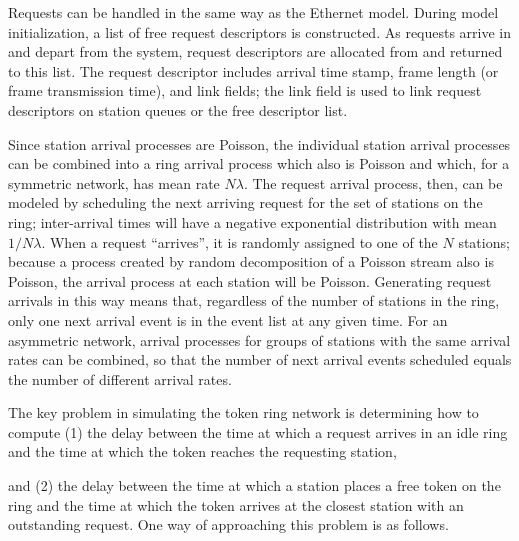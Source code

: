 Requests can be handled in the same way as the Ethernet model. During model initialization, a list of free request descriptors is constructed. As requests arrive in and depart from the system, request descriptors are allocated from and returned to this list. The request descriptor includes arrival time stamp, frame length (or frame transmission time), and link fields; the link field is used to link request descriptors on station queues or the free descriptor list.

Since station arrival processes are Poisson, the individual station arrival processes can be combined into a ring arrival process which also is Poisson and which, for a symmetric network, has mean rate $N\lambda$. The request arrival process, then, can be modeled by scheduling the next arriving request for the set of stations on the ring; inter-arrival times will have a negative exponential distribution with mean $1/N\lambda$. When a request ``arrives'', it is randomly assigned to one of the $N$ stations; because a process created by random decomposition of a Poisson stream also is Poisson, the arrival process at each station will be Poisson. Generating request arrivals in this way means that, regardless of the number of stations in the ring, only one next arrival event is in the event list at any given time. For an asymmetric network, arrival processes for groups of stations with the same arrival rates can be combined, so that the number of next arrival events scheduled equals the number of different arrival rates.

The key problem in simulating the token ring network is determining how to compute (1) the delay between the time at which a request arrives in an idle ring and the time at which the token reaches the requesting station,

\noindent and (2) the delay between the time at which a station places a free token on the ring and the time at which the token arrives at the closest station with an outstanding request. One way of approaching this problem is as follows.

